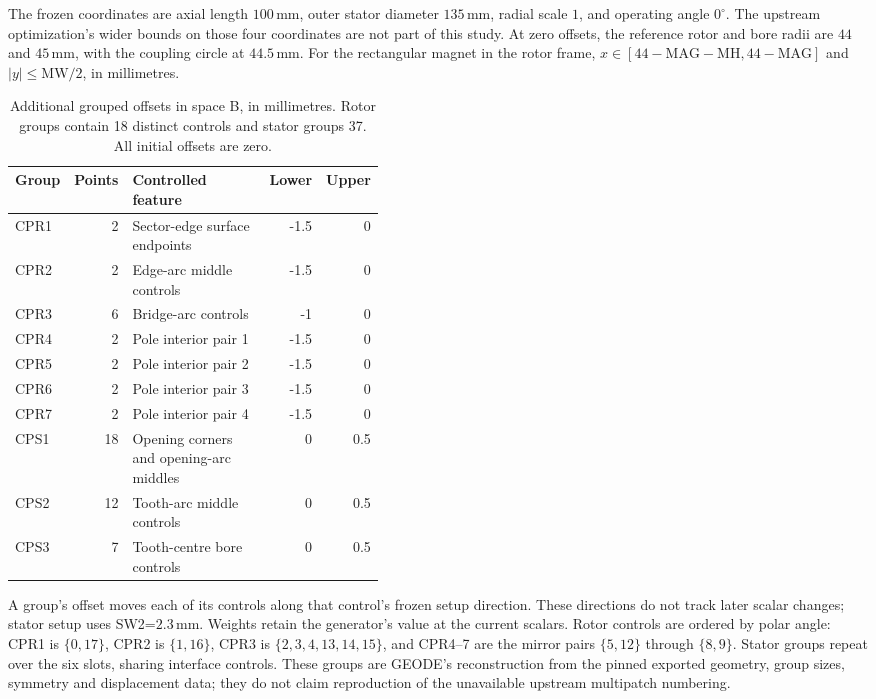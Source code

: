The frozen coordinates are axial length $100\,\mathrm{mm}$, outer stator
diameter $135\,\mathrm{mm}$, radial scale $1$, and operating angle $0^\circ$.
The upstream optimization's wider bounds on those four coordinates are not
part of this study. At zero offsets, the reference rotor and bore radii are
$44$ and $45\,\mathrm{mm}$, with the coupling circle at $44.5\,\mathrm{mm}$.
For the rectangular magnet in the rotor frame,
$x\in[44-\mathrm{MAG}-\mathrm{MH},44-\mathrm{MAG}]$ and
$|y|\leq\mathrm{MW}/2$, in millimetres.

\begin{table}[ht]
\centering\small
\begin{tabular}{lrp{0.43\linewidth}rr}
\toprule
Group & Points & Controlled feature & Lower & Upper \\
\midrule
CPR1 & 2 & Sector-edge surface endpoints & -1.5 & 0 \\
CPR2 & 2 & Edge-arc middle controls & -1.5 & 0 \\
CPR3 & 6 & Bridge-arc controls & -1 & 0 \\
CPR4 & 2 & Pole interior pair 1 & -1.5 & 0 \\
CPR5 & 2 & Pole interior pair 2 & -1.5 & 0 \\
CPR6 & 2 & Pole interior pair 3 & -1.5 & 0 \\
CPR7 & 2 & Pole interior pair 4 & -1.5 & 0 \\
CPS1 & 18 & Opening corners and opening-arc middles & 0 & 0.5 \\
CPS2 & 12 & Tooth-arc middle controls & 0 & 0.5 \\
CPS3 & 7 & Tooth-centre bore controls & 0 & 0.5 \\
\bottomrule
\end{tabular}
\caption{Additional grouped offsets in space B, in millimetres. Rotor groups
contain 18 distinct controls and stator groups 37. All initial offsets are zero.}
\label{tab:prospective-groups}
\end{table}

A group's offset moves each of its controls along that control's frozen
setup direction. These directions do not track later scalar changes; stator
setup uses SW2=$2.3\,\mathrm{mm}$. Weights retain the generator's value at the
current scalars. Rotor controls are ordered by polar angle: CPR1 is
$\{0,17\}$, CPR2 is $\{1,16\}$, CPR3 is $\{2,3,4,13,14,15\}$, and CPR4--7
are the mirror pairs $\{5,12\}$ through $\{8,9\}$.
Stator groups repeat over the six slots, sharing interface controls.
These groups are GEODE's reconstruction from the pinned exported geometry,
group sizes, symmetry and displacement data; they do not claim reproduction
of the unavailable upstream multipatch numbering.

